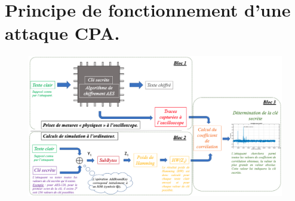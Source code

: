 \documentclass[10pt, oneside, a4paper]{article}
\begin{document}
\section{Principe de fonctionnement d'une attaque CPA.}
\label{ann:CPAconcrete}
\begin{figure}[htbp]
    \centering
    \includegraphics[scale=0.45, angle=90]{image/CPAconcrete}
    \label{fig:CPAconcrete}
\end{figure}

\newpage

\end{document}
